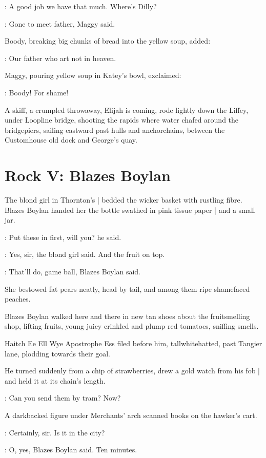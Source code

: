 \katey:
A good job we have that much. Where's Dilly?

\maggy:
Gone to meet father, Maggy said.

Boody, breaking big chunks of bread into the yellow soup,
added:

\boody:
Our father who art not in heaven.

Maggy, pouring yellow soup in Katey's bowl, exclaimed:

\maggy:
Boody! For shame!

A skiff,
a crumpled throwaway,
Elijah is coming,
rode lightly down the Liffey,
under Loopline bridge,
shooting the rapids where water chafed around the bridgepiers,
sailing eastward past hulls and anchorchains,
between the Customhouse old dock and George's quay.


\section*{Rock V: Blazes Boylan}


The blond girl in Thornton's |
bedded the wicker basket with rustling fibre.
Blazes Boylan handed her the bottle swathed in pink tissue paper |
and a small jar.

\boylan:
Put these in first, will you?
he said.

\blondgirl:
Yes, sir,
the blond girl said.
And the fruit on top.

\boylan:
That'll do, game ball,
Blazes Boylan said.

She bestowed fat pears neatly,
head by tail,
and among them ripe shamefaced peaches.

Blazes Boylan walked here and there in new tan shoes
about the fruitsmelling shop,
lifting fruits,
young juicy crinkled and plump red tomatoes,
sniffing smells.

Haitch Ee Ell Wye Apostrophe Ess \stage{[H.E.L.Y.'S]}
filed before him, tallwhitehatted,
past Tangier lane,
plodding towards their goal.

He turned suddenly from a chip of strawberries,
drew a gold watch from his fob |
and held it at its chain's length.

\boylan:
Can you send them by tram? Now?

A darkbacked figure under Merchants' arch
scanned books on the hawker's cart.

\blondgirl:
Certainly, sir. Is it in the city?

\boylan:
O, yes,
Blazes Boylan said.
Ten minutes.

